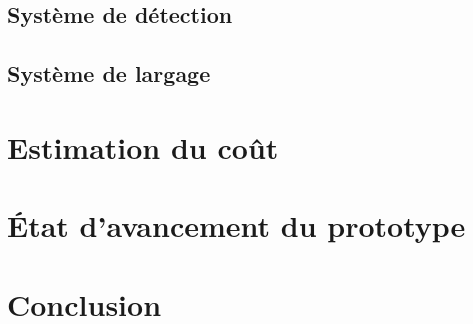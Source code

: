 \documentclass[a4paper,12pt,french]{report}
\begin{document}
\section{Système de détection}

\section{Système de largage}

\chapter{Estimation du coût }

\chapter{État d'avancement du prototype}

\chapter*{Conclusion}
\end{document}

